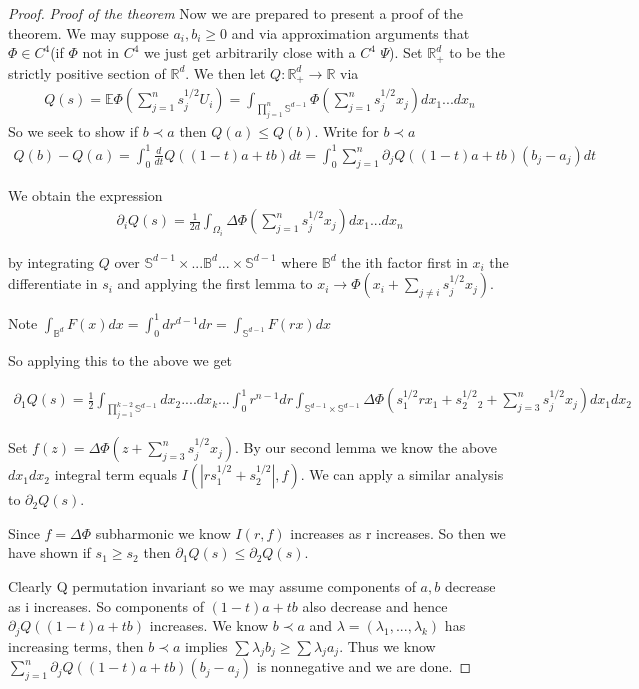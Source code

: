 \documentclass[10pt]{article}
\newcommand{\E}{\mathbb{E}}
\newcommand{\1}{\textbf{1}}
\newcommand{\R}{\mathbb{R}}
\theoremstyle{remark}
\theoremstyle{definition}
\begin{document}
\begin{proof}\textit{Proof of the theorem}
	Now we are prepared to present a proof of the theorem. We may suppose $a_i,b_i \geq 0$ and via approximation arguments that $\Phi \in C^4$(if $\Phi$ not in $C^4$ we just get arbitrarily close with a $C^4$ $\Psi$). Set $\R_+^d$ to be the strictly positive section of $\R^d$. We then let $Q: \R_+^d \to \R$ via
	\begin{align*}
		Q(s) = \E \Phi(\sum_{j=1}^n s_j^{1/2}U_i) = \int_{\prod_{j=1}^n \mathbb{S}^{d-1}} \Phi(\sum_{j=1}^n s_j^{1/2}x_j)dx_1...dx_n
	\end{align*}
	So we seek to show if $b \prec a$ then $Q(a) \leq Q(b)$. Write for $b \prec a$
	\begin{align*}
		Q(b) - Q(a) = \int_0^1 \frac{d}{dt}Q((1-t)a + tb) dt = \int_0^1 \sum_{j=1}^n \partial_j Q((1-t)a+tb)(b_j-a_j)dt
	\end{align*}

	We obtain the expression
	\begin{align*}
		\partial_i Q(s) = \frac{1}{2d} \int_{\Omega_i}\Delta \Phi(\sum_{j=1}^n s_j^{1/2}x_j)dx_1...dx_n
	\end{align*}

	by integrating $Q$ over $\mathbb{S}^{d-1} \times ... \mathbb{B}^d ... \times \mathbb{S}^{d-1}$ where $\mathbb{B}^d$ the ith factor first in $x_i$ the differentiate in $s_i$ and applying the first lemma to $x_i \to \Phi(x_i + \sum_{j\neq i}s_j^{1/2}x_j)$. 

	Note $\int_{\mathbb{B}^d} F(x)dx = \int_0^1 d r^{d-1}dr = \int_{\mathbb{S}^{d-1}}F(rx)dx$ 

	So applying this to the above we get

	\begin{align*}
		\partial_1 Q(s) = \frac{1}{2} \int_{\prod_{j=1}^{k-2}\mathbb{S}^{d-1}} dx_2....dx_k... \int_0^1 r^{n-1}dr\int_{\mathbb{S}^{d-1}\times \mathbb{S}^{d-1}} \Delta \Phi(s_1^{1/2}rx_1 + s_2^{1/2}_2 + \sum_{j=3}^n s_j^{1/2}x_j)dx_1dx_2
	\end{align*}

	Set $f(z) = \Delta \Phi (z+\sum_{j=3}^ns_j^{1/2}x_j)$. By our second lemma we know the above $dx_1dx_2$ integral term equals $I(|rs_1^{1/2} + s_2^{1/2}|,f)$. We can apply a similar analysis to $\partial_2 Q(s)$.  

	Since $f = \Delta \Phi$ subharmonic we know $I(r,f)$ increases as r increases. So then we have shown if $s_1 \geq s_2$ then $\partial_1 Q(s) \leq \partial_2 Q(s)$. 

	Clearly Q permutation invariant so we may assume components of $a,b$ decrease as i increases. So components of $(1-t)a + tb$ also decrease and hence $\partial_j Q((1-t)a+tb)$ increases. We know $b \prec a$ and $\lambda = (\lambda_1,...,\lambda_k)$ has increasing terms, then $b \prec a$ implies $\sum \lambda_j b_j \geq \sum \lambda_j a_j$. Thus we know $\sum_{j=1}^n \partial_j Q((1-t)a+tb)(b_j - a_j)$ is nonnegative and we are done.
\end{proof}
\end{document}

